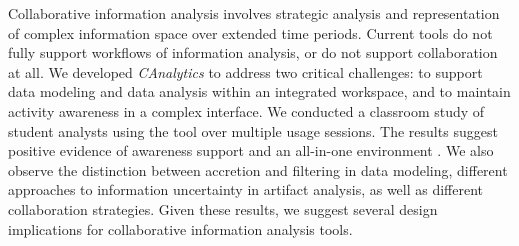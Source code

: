 
Collaborative information analysis involves strategic analysis and representation of complex information space over extended time periods. Current tools do not fully support workflows of information analysis, or do not support collaboration at all. We developed \emph{CAnalytics} to address two critical challenges: to support data modeling and data analysis within an integrated workspace, and to maintain activity awareness in a complex interface. We conducted a classroom study of student analysts using the tool over multiple usage sessions. The results suggest positive evidence of awareness support and an all-in-one environment . We also observe the distinction between accretion and filtering in data modeling, different approaches to information uncertainty in artifact analysis, as well as different collaboration strategies. Given these results, we suggest several design implications for collaborative information analysis tools.
